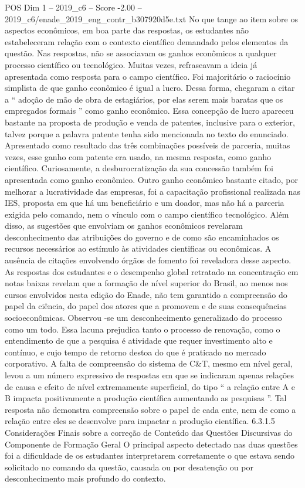\begin{textsample}{POS Dim 1 – 2019\_c6 – Score -2.00 – 2019\_c6/enade\_2019\_eng\_contr\_b307920d5e.txt}
No que tange ao item sobre os aspectos econômicos, em boa parte das respostas, os estudantes não estabeleceram relação com o contexto científico demandado pelos elementos da questão.
Nas respostas, não se associavam os ganhos econômicos a qualquer processo científico ou tecnológico.
Muitas vezes, refraseavam a ideia já apresentada como resposta para o campo científico.
Foi majoritário o raciocínio simplista de que ganho econômico é igual a lucro.
Dessa forma, chegaram a citar a “ adoção de mão de obra de estagiários, por elas serem mais baratas que os empregados formais ” como ganho econômico.
Essa concepção de lucro apareceu bastante na proposta de produção e venda de patentes, inclusive para o exterior, talvez porque a palavra patente tenha sido mencionada no texto do enunciado.
Apresentado como resultado das três combinações possíveis de parceria, muitas vezes, esse ganho com patente era usado, na mesma resposta, como ganho científico.
Curiosamente, a desburocratização da sua concessão também foi apresentada como ganho econômico.
Outro ganho econômico bastante citado, por melhorar a lucratividade das empresas, foi a capacitação profissional realizada nas IES, proposta em que há um beneficiário e um doador, mas não há a parceria exigida pelo comando, nem o vínculo com o campo científico tecnológico.
Além disso, as sugestões que envolviam os ganhos econômicos revelaram desconhecimento das atribuições do governo e de como são encaminhados os recursos necessários ao estímulo às atividades cientificas ou econômicas.
A ausência de citações envolvendo órgãos de fomento foi reveladora desse aspecto.
As respostas dos estudantes e o desempenho global retratado na concentração em notas baixas revelam que a formação de nível superior do Brasil, ao menos nos cursos envolvidos nesta edição do Enade, não tem garantido a compreensão do papel da ciência, do papel dos atores que a promovem e de suas consequências socioeconômicas.
Observou -se um desconhecimento generalizado do processo como um todo.
Essa lacuna prejudica tanto o processo de renovação, como o entendimento de que a pesquisa é atividade que requer investimento alto e contínuo, e cujo tempo de retorno destoa do que é praticado no mercado corporativo.
A falta de compreensão do sistema de C\&T, mesmo em nível geral, levou a um número expressivo de respostas em que se indicaram apenas relações de causa e efeito de nível extremamente superficial, do tipo “ a relação entre A e B impacta positivamente a produção científica aumentando as pesquisas ”.
Tal resposta não demonstra compreensão sobre o papel de cada ente, nem de como a relação entre eles se desenvolve para impactar a produção científica. 6.3.1.5 Considerações Finais sobre a correção de Conteúdo das Questões Discursivas do Componente de Formação Geral O principal aspecto detectado nas duas questões foi a dificuldade de os estudantes interpretarem corretamente o que estava sendo solicitado no comando da questão, causada ou por desatenção ou por desconhecimento mais profundo do contexto.

\end{textsample}

